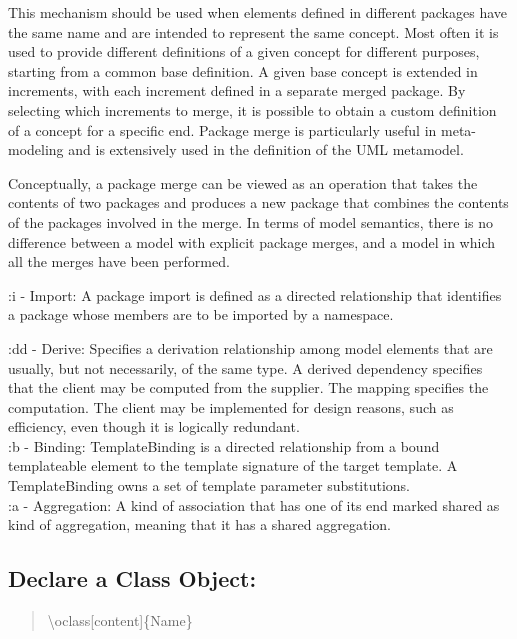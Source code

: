 \documentclass[10pt,a4paper,english]{article}
\begin{document}
\begin{flushleft}
	This mechanism should be used when elements defined in different packages have the same name and are intended to represent the same concept. Most often it is used to provide different definitions of a given concept for different purposes, starting from a common base definition. A given base concept is extended in increments, with each increment defined in a separate merged package. By selecting which increments to merge, it is possible to obtain a custom definition of a concept for a specific end. Package merge is particularly useful in meta-modeling and is extensively used in the definition of the UML metamodel.

	Conceptually, a package merge can be viewed as an operation that takes the contents of two packages and produces a new package that combines the contents of the packages involved in the merge. In terms of model semantics, there is no difference between a model with explicit package merges, and a model in which all the merges have been performed.
~\\ \medskip

:i - Import: A package import is defined as a directed relationship that identifies a package whose members are to be imported by a namespace.
~\\ \medskip

:dd - Derive: Specifies a derivation relationship among model elements that are usually, but not necessarily, of the same type. A derived dependency specifies that the client may be computed from the supplier. The mapping specifies the computation. The client may be implemented for design reasons, such as efficiency, even though it is logically redundant.
~\\ \medskip
:b - Binding: TemplateBinding is a directed relationship from a bound templateable element to the template signature of the target template. A TemplateBinding owns a set of template parameter substitutions.
~\\ \medskip
:a - Aggregation: A kind of association that has one of its end marked shared as kind of aggregation, meaning that it has a shared aggregation.
~\\ \medskip

\subsection*{Declare a Class Object:}
\begin{quote}{\ttfamily \raggedright \noindent
{\textbackslash}oclass[content]{\{}Name{\}} 
}\end{quote}


\end{flushleft}
\end{document}
